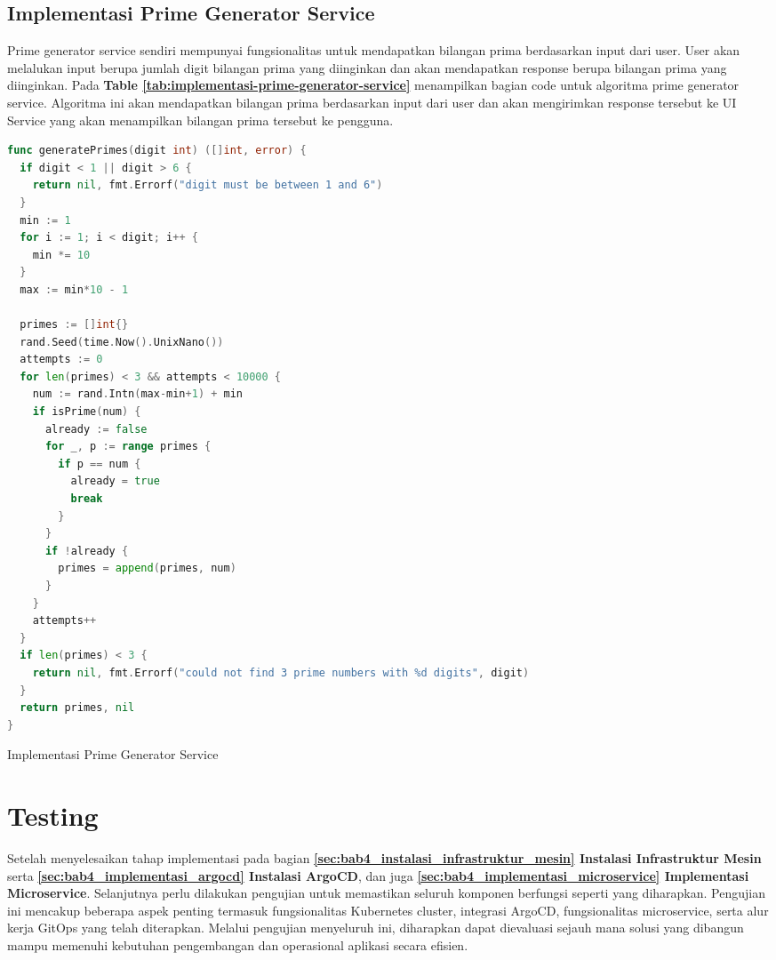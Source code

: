 \subsection{Implementasi Prime Generator Service}\label{subsec:implementasi_prime_generator_service}
Prime generator service sendiri mempunyai fungsionalitas untuk mendapatkan
bilangan prima berdasarkan input dari user. User akan melalukan input berupa
jumlah digit bilangan prima yang diinginkan dan akan mendapatkan response
berupa bilangan prima yang diinginkan. Pada \textbf{Table
  \ref{tab:implementasi-prime-generator-service}} menampilkan bagian code untuk
algoritma prime generator service. Algoritma ini akan mendapatkan bilangan
prima berdasarkan input dari user dan akan mengirimkan response tersebut ke UI
Service yang akan menampilkan bilangan prima tersebut ke pengguna.

\begin{table}[H]
  \centering
  \begin{minipage}{0.95\linewidth}
    \begin{lstlisting}[language=go, basicstyle=\footnotesize\ttfamily]
func generatePrimes(digit int) ([]int, error) {
  if digit < 1 || digit > 6 {
    return nil, fmt.Errorf("digit must be between 1 and 6")
  }
  min := 1
  for i := 1; i < digit; i++ {
    min *= 10
  }
  max := min*10 - 1

  primes := []int{}
  rand.Seed(time.Now().UnixNano())
  attempts := 0
  for len(primes) < 3 && attempts < 10000 {
    num := rand.Intn(max-min+1) + min
    if isPrime(num) {
      already := false
      for _, p := range primes {
        if p == num {
          already = true
          break
        }
      }
      if !already {
        primes = append(primes, num)
      }
    }
    attempts++
  }
  if len(primes) < 3 {
    return nil, fmt.Errorf("could not find 3 prime numbers with %d digits", digit)
  }
  return primes, nil
}
    \end{lstlisting}
  \end{minipage}
  \caption{Implementasi Prime Generator Service}
  \label{tab:implementasi-prime-generator-service}
\end{table}

\section{Testing}
Setelah menyelesaikan tahap implementasi pada bagian
\textbf{\ref{sec:bab4_instalasi_infrastruktur_mesin} Instalasi Infrastruktur
  Mesin} serta \textbf{\ref{sec:bab4_implementasi_argocd} Instalasi ArgoCD}, dan
juga \textbf{\ref{sec:bab4_implementasi_microservice} Implementasi
  Microservice}. Selanjutnya perlu dilakukan pengujian untuk memastikan seluruh
komponen berfungsi seperti yang diharapkan. Pengujian ini mencakup beberapa
aspek penting termasuk fungsionalitas Kubernetes cluster, integrasi ArgoCD,
fungsionalitas microservice, serta alur kerja GitOps yang telah diterapkan.
Melalui pengujian menyeluruh ini, diharapkan dapat dievaluasi sejauh mana
solusi yang dibangun mampu memenuhi kebutuhan pengembangan dan operasional
aplikasi secara efisien.

